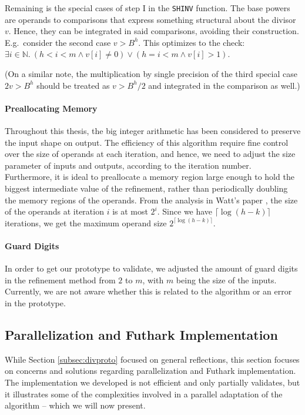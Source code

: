Remaining is the special cases of step I in the \texttt{SHINV} function. The
base powers are operands to comparisons that express something structural about
the divisor $v$. Hence, they can be integrated in said comparisons, avoiding
their construction.  E.g.\ consider the second case $v > B^h$. This optimizes to
the check: $\exists i\in \mathbb{N}.~(h<i<m \land v[i] \neq 0) \lor (h = i<m \land v[i] > 1)$.

(On a similar note, the multiplication by single precision of the third special
case $2v > B^h$ should be treated as $v > B^h/2$ and integrated in the
comparison as well.)

\paragraph{Preallocating Memory}
Throughout this thesis, the big integer arithmetic has been considered to preserve
the input shape on output. The efficiency of this algorithm require fine control
over the size of operands at each iteration, and hence, we need to adjust the
size parameter of inputs and outputs, according to the iteration
number. Furthermore, it is ideal to preallocate a memory region large enough to
hold the biggest intermediate value of the refinement, rather than periodically
doubling the memory regions of the operands. From the analysis in Watt's paper
\cite{watt2023efficient}, the size of the operands at iteration $i$ is at most
$2^i$. Since we have $\lceil \log (h-k) \rceil$ iterations, we get the maximum operand
size $2^{\lceil \log (h-k) \rceil}$.


\paragraph{Guard Digits}
In order to get our prototype to validate, we adjusted the amount of guard
digits in the refinement method from $2$ to $m$, with $m$ being the size of the
inputs. Currently, we are not aware whether this is related to the algorithm or
an error in the prototype.

\subsection{Parallelization and Futhark Implementation}
\label{subsec:divfut}

While Section \ref{subsec:divproto} focused on general reflections, this section
focuses on concerns and solutions regarding parallelization and Futhark
implementation. The implementation we developed is not efficient and only
partially validates, but it illustrates some of the complexities involved in a
parallel adaptation of the algorithm -- which we will now present.

